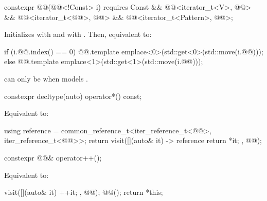 %
\begin{itemdecl}
constexpr @@(@@<!Const> i)
    requires Const && @@<iterator_t<V>, @@> &&
             @@<iterator_t<@@>, @@> &&
             @@<iterator_t<Pattern>, @@>;
\end{itemdecl}

\begin{itemdescr}
\pnum
\effects
Initializes  with
 and
 with .
Then, equivalent to:
\begin{codeblock}
if (i.@@.index() == 0)
  @@.template emplace<0>(std::get<0>(std::move(i.@@)));
else
  @@.template emplace<1>(std::get<1>(std::move(i.@@)));
\end{codeblock}

\pnum
\begin{note}
 can only be 
when  models .
\end{note}
\end{itemdescr}

%
\begin{itemdecl}
constexpr decltype(auto) operator*() const;
\end{itemdecl}

\begin{itemdescr}
\pnum
\effects
Equivalent to:
\begin{codeblock}
using reference =
  common_reference_t<iter_reference_t<@@>, iter_reference_t<@@>>;
return visit([](auto& it) -> reference { return *it; }, @@);
\end{codeblock}
\end{itemdescr}

%
\begin{itemdecl}
constexpr @@& operator++();
\end{itemdecl}

\begin{itemdescr}
\pnum
\effects
Equivalent to:
\begin{codeblock}
visit([](auto& it){ ++it; }, @@);
@@();
return *this;
\end{codeblock}
\end{itemdescr}

